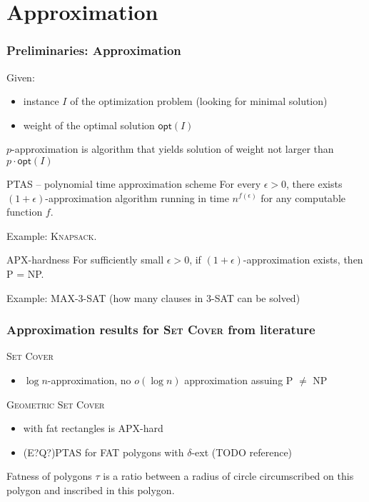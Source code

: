 \documentclass{beamer}
\begin{document}
\section{Approximation}
\begin{frame}
\frametitle{Preliminaries: Approximation}
Given:
\begin{itemize}
\item instance $I$ of the optimization problem (looking for minimal solution)
\item weight of the optimal solution $\mathsf{opt}(I)$
\end{itemize}
$p$-approximation is algorithm that yields solution of weight not larger than
$p\cdot \mathsf{opt}(I)$
\begin{block}{PTAS -- polynomial time approximation scheme}
For every $\epsilon > 0$, there exists $(1+\epsilon)$-approximation
algorithm running in time $n^{f(\epsilon)}$ for any computable function $f$.

Example: \textsc{Knapsack}.

\end{block}

\begin{block}{APX-hardness}
For sufficiently small $\epsilon > 0$,
if $(1+\epsilon)$-approximation exists, then P = NP.

Example: \textsc{MAX-3-SAT} (how many clauses in 3-SAT can be solved)
\end{block}


\end{frame}
\begin{frame}
\frametitle{Approximation results for \textsc{Set Cover} from literature}
\textsc{Set Cover}
\begin{itemize}
\item $\log n$-approximation, no $o(\log n)$ approximation assuing P $\neq$ NP
\end{itemize}

\textsc{Geometric Set Cover}
\begin{itemize}
\item with fat rectangles is APX-hard
\item (E?Q?)PTAS for FAT polygons with $\delta$-ext (TODO reference)
\end{itemize}


\begin{definition}{
Fatness of polygons $\tau$ is a ratio between a radius of circle
circumscribed on this polygon and inscribed in this polygon.
}\end{definition}


\end{frame}
\end{document}
